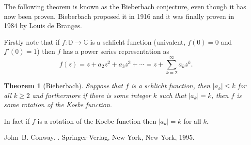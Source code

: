 \documentclass[12pt]{article}
\theoremstyle{theorem}
\newtheorem*{thm}{Theorem}
\theoremstyle{definition}
\begin{document}
The following theorem is known as the Bieberbach conjecture, even though it has
now been proven.  Bieberbach proposed it in 1916 and it was finally proven in 1984 by Louis de Branges.

Firstly note that if $f \colon {\mathbb{D}} \to {\mathbb{C}}$ is a schlicht function (univalent, $f(0) = 0$ and $f'(0) = 1$) then $f$ has a power series representation
as
\begin{equation*}
f(z) = z + a_2 z^2 + a_3 z^3 + \cdots = z + \sum_{k=2}^\infty a_k z^k .
\end{equation*}

\begin{thm}[Bieberbach]
Suppose that $f$ is a schlicht function, then $\lvert a_k \rvert \leq k$ for
all $k \geq 2$ and furthermore
if there is some integer $k$ such that $\lvert a_k \rvert = k$, then $f$ is some rotation of the Koebe function.
\end{thm}

In fact if $f$ is a rotation of the Koebe function then $\lvert a_k \rvert = k$
for all $k$.

\begin{thebibliography}{9}
John~B. Conway.
{\em {}}.
Springer-Verlag, New York, New York, 1995.
\end{thebibliography}
\end{document}

